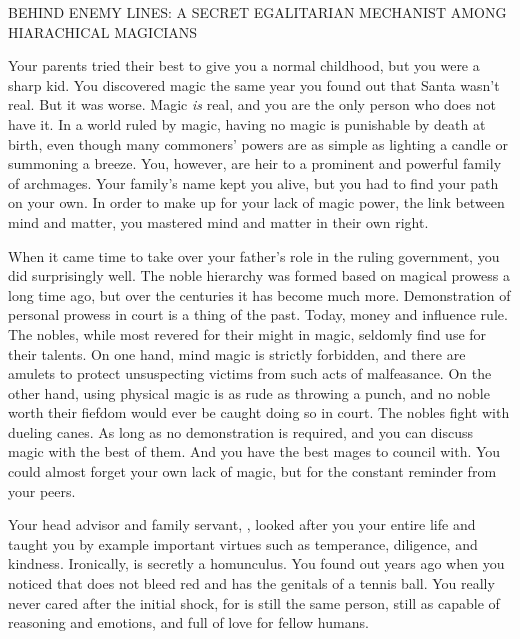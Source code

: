\documentclass[char]{guildcamp3}
\begin{document}
\name{\cNobleOne{}}




BEHIND ENEMY LINES: A SECRET EGALITARIAN MECHANIST AMONG HIARACHICAL MAGICIANS

Your parents tried their best to give you a normal childhood, but you were a sharp kid. You discovered magic the same year you found out that Santa wasn't real. But it was worse. Magic \emph{is} real, and you are the only person who does not have it. In a world ruled by magic, having no magic is punishable by death at birth, even though many commoners' powers are as simple as lighting a candle or summoning a breeze. You, however, are heir to a prominent and powerful family of archmages. Your family's name kept you alive, but you had to find your path on your own. In order to make up for your lack of magic power, the link between mind and matter, you mastered mind and matter in their own right.

When it came time to take over your father's role in the ruling government, you did surprisingly well. The noble hierarchy was formed based on magical prowess a long time ago, but over the centuries it has become much more. Demonstration of personal prowess in court is a thing of the past. Today, money and influence rule. The nobles, while most revered for their might in magic, seldomly find use for their talents. On one hand, mind magic is strictly forbidden, and there are amulets to protect unsuspecting victims from such acts of malfeasance. On the other hand, using physical magic is as rude as throwing a punch, and no noble worth their fiefdom would ever be caught doing so in court. The nobles fight with dueling canes. As long as no demonstration is required, and you can discuss magic with the best of them. And you have the best mages to council with. You could almost forget your own lack of magic, but for the constant reminder from your peers.

Your head advisor and family servant, \cServant{\intro}, looked after you your entire life and taught you by example important virtues such as temperance, diligence, and kindness. Ironically,  is secretly a homunculus. You found out years ago when you noticed that  does not bleed red and has the genitals of a tennis ball. You really never cared after the initial shock, for  is still the same person, still as capable of reasoning and emotions, and full of love for  fellow humans.
\end{document}
